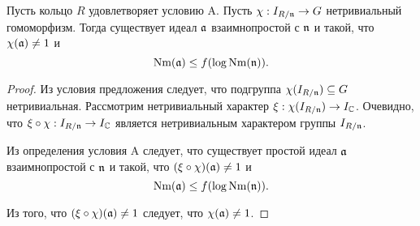 \documentclass[_00_dissertation.tex]{subfiles}
\begin{document}
\begin{proposition}\label{proposition:condition_A_with_any_homomorphism}
    Пусть кольцо $R$ удовлетворяет условию A.
    Пусть $\chi: I_{R/\mathfrak{n}} \to G$ нетривиальный гомоморфизм.
    Тогда существует идеал $\mathfrak{a}$ взаимнопростой с $\mathfrak{n}$ и такой, что $\chi(\mathfrak{a}) \neq 1$ и
    \begin{equation*}
        \textrm{Nm}(\mathfrak{a}) \le f(\log{\textrm{Nm}(\mathfrak{n})}).
    \end{equation*}
\end{proposition}
\begin{proof}
    Из условия предложения следует, что подгруппа $\chi(I_{R/\mathfrak{n}}) \subseteq G$ нетривиальная.
    Рассмотрим нетривиальный характер $\xi: \chi(I_{R/\mathfrak{n}}) \to I_{\mathbb{C}}$.
    Очевидно, что $\xi \circ \chi: I_{R/\mathfrak{n}} \to I_{\mathbb{C}}$ является нетривиальным характером группы $I_{R/\mathfrak{n}}$.
    
    Из определения условия A следует, что существует простой идеал $\mathfrak{a}$ взаимнопростой с $\mathfrak{n}$ и такой, что $(\xi \circ \chi)(\mathfrak{a}) \neq 1$ и
    \begin{equation*}
        \textrm{Nm}(\mathfrak{a}) \le f(\log{\textrm{Nm}(\mathfrak{n})}).
    \end{equation*}
    
    Из того, что $(\xi \circ \chi)(\mathfrak{a}) \neq 1$ следует, что $\chi(\mathfrak{a}) \neq 1$.
\end{proof}
\end{document}

